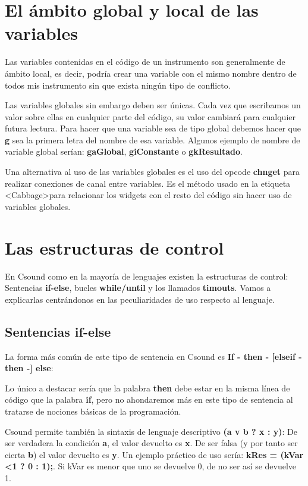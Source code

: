 \section{El ámbito global y local de las variables}

Las variables contenidas en el código de un instrumento son generalmente de ámbito local, es decir, podría crear una variable con el mismo nombre dentro de todos mis instrumento sin que exista ningún tipo de conflicto.

Las variables globales sin embargo deben ser únicas. Cada vez que escribamos un valor sobre ellas en cualquier parte del código, su valor cambiará para cualquier futura lectura. Para hacer que una variable sea de tipo global debemos hacer que \textbf{g} sea la primera letra del nombre de esa variable. Algunos ejemplo de nombre de variable global serían: \textbf{gaGlobal}, \textbf{giConstante} o \textbf{gkResultado}.

Una alternativa al uso de las variables globales es el uso del opcode \textbf{chnget} para realizar conexiones de canal entre variables. Es el método usado en la etiqueta \textless Cabbage\textgreater para relacionar los widgets con el resto del código sin hacer uso de variables globales.

\section{Las estructuras de control}

En Csound como en la mayoría de lenguajes existen la estructuras de control: Sentencias \textbf{if-else}, bucles \textbf{while/until} y los llamados \textbf{timouts}. Vamos a explicarlas centrándonos en las peculiaridades de uso respecto al lenguaje.

\subsection{Sentencias if-else}

La forma más común de este tipo de sentencia en Csound es \textbf{If - then - [elseif - then -] else}:


Lo único a destacar sería que la palabra \textbf{then} debe estar en la misma línea de código que la palabra \textbf{if}, pero no ahondaremos más en este tipo de sentencia al tratarse de nociones básicas de la programación.

Csound permite también la sintaxis de lenguaje descriptivo \textbf{(a v b ? x : y)}: De ser verdadera la condición \textbf{a}, el valor devuelto es \textbf{x}. De ser falsa (y por tanto ser cierta \textbf{b}) el valor devuelto es \textbf{y}. Un ejemplo práctico de uso sería: \textbf{kRes = (kVar \textless 1 ? 0 : 1);}. Si kVar es menor que uno se devuelve 0, de no ser así se devuelve 1.

